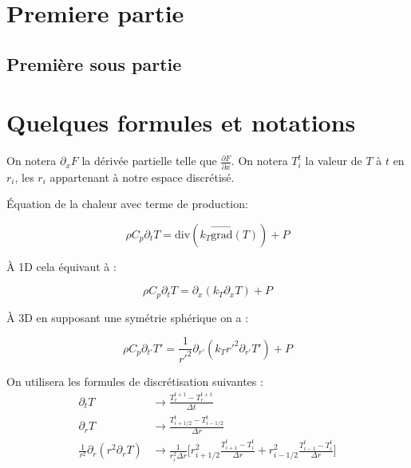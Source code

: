 \documentclass[10pt,a4paper]{article}
\numberwithin{equation}{section}
\begin{document}
\section{Premiere partie}

\subsection{Première sous partie}



\section{Quelques formules et notations}
On notera $\partial_x F$ la dérivée partielle telle que $\frac{\partial F}{\partial x}$. On notera $T^t_i$ la valeur de $T$ à $t$ en $r_i$, les $r_i$ appartenant à notre espace discrétisé.


Équation de la chaleur avec terme de production:

\begin{equation}
\rho C_p \partial_t T = \textrm{div} ( k_{T} \vec{\textrm{grad}}(T))  + P
\end{equation}

À 1D cela équivaut à :

\begin{equation}
\rho C_p \partial_t T = \partial_x ( k_{T} \partial_x T)  + P
\end{equation}


 À 3D en supposant une symétrie sphérique on a :

\begin{equation}
\rho C_p \partial_{t'} T' = \frac{1}{r'^2} \partial_{r'} ( k_{T} {r'}^2 \partial_{r'} T')  + P
\end{equation}





On utilisera les formules de discrétisation suivantes :
\begin{align}
\partial_t T &\rightarrow  \frac{T^{t+1}_r - T^{t+1}_r}{\Delta t}\\
\partial_r T &\rightarrow  \frac{T^t_{i+1/2} - T^{t}_{i-1/2}}{\Delta r} \\
\frac{1}{r^2}\partial_r (r^2 \partial_r T ) &\rightarrow \frac{1}{r^2_i \Delta r}\Big [ r^2_{i+1/2}\frac{T^t_{i+1} - T^{t}_{i}}{\Delta r} + r^2_{i-1/2}\frac{T^t_{i-1} - T^{t}_{i}}{\Delta r} \Big]
\end{align}
\end{document}
